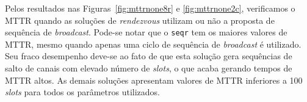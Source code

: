 {Pelos resultados nas Figuras~\ref{fig:mttrnone8r} e \ref{fig:mttrnone2c}, verificamos o MTTR quando as soluções de {\it rendezvous} utilizam ou não a proposta de sequência de {\it broadcast}. Pode-se notar que o {\tt seqr} tem os maiores valores de MTTR, mesmo quando apenas uma ciclo de sequência de {\it broadcast} é utilizado. Seu fraco desempenho deve-se ao fato de que esta solução gera sequências de salto de canais com elevado número de {\it slots}, o que acaba gerando tempos de MTTR altos. As demais soluções apresentam valores de MTTR inferiores a 100 {\it slots} para todos os parâmetros utilizados. %







}
